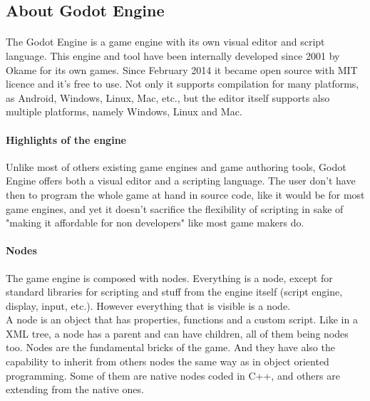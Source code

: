\documentclass[10pt,a4paper]{article}
\begin{document}
\subsection{About Godot Engine}
\paragraph{}
The Godot Engine is a game engine with its own visual editor and script language. This engine and tool have been internally developed since 2001 by Okame for its own games. Since February 2014 it became open source with MIT licence and it's free to use. Not only it supports compilation for many platforms, as Android, Windows, Linux, Mac, etc., but the editor itself supports also multiple platforms, namely Windows, Linux and Mac.
\paragraph{Highlights of the engine}
Unlike most of others existing game engines and game authoring tools, Godot Engine offers both a visual editor and a scripting language. The user don't have then to program the whole game at hand in source code, like it would be for most game engines, and yet it doesn't sacrifice the flexibility of scripting in sake of "making it affordable for non developers" like most game makers do. 
\paragraph{Nodes}
The game engine is composed with nodes. Everything is a node, except for standard libraries for scripting and stuff from the engine itself (script engine, display, input, etc.). However everything that is visible is a node. \\
A node is an object that has properties, functions and a custom script. Like in a XML tree, a node has a parent and can have children, all of them being nodes too. Nodes are the fundamental bricks of the game. And they have also the capability to inherit from others nodes the same way as in object oriented programming. Some of them are native nodes coded in C++, and others are extending from the native ones.
\end{document}
